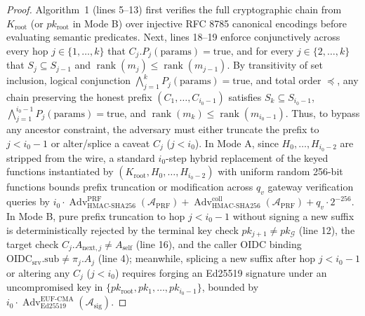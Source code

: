 \documentclass[conference,10pt]{IEEEtran}
\begin{document}
\begin{proof}
Algorithm~1 (lines 5--13) first verifies the full cryptographic chain from $K_{\text{root}}$ (or $pk_{\text{root}}$ in Mode B) over injective RFC 8785 canonical encodings before evaluating semantic predicates. Next, lines 18--19 enforce conjunctively across every hop $j \in \{1, \dots, k\}$ that $C_j.P_j(\text{params}) = \text{true}$, and for every $j \in \{2, \dots, k\}$ that $S_j \subseteq S_{j-1}$ and $\operatorname{rank}(m_j) \le \operatorname{rank}(m_{j-1})$. By transitivity of set inclusion, logical conjunction $\bigwedge_{j=1}^k P_j(\text{params}) = \text{true}$, and total order $\preceq$, any chain preserving the honest prefix $(C_1, \dots, C_{i_0-1})$ satisfies $S_k \subseteq S_{i_0-1}$, $\bigwedge_{j=1}^{i_0-1} P_j(\text{params}) = \text{true}$, and $\operatorname{rank}(m_k) \le \operatorname{rank}(m_{i_0-1})$. Thus, to bypass any ancestor constraint, the adversary must either truncate the prefix to $j < i_0 - 1$ or alter/splice a caveat $C_j$ ($j < i_0$). In Mode A, since $H_0, \dots, H_{i_0-2}$ are stripped from the wire, a standard $i_0$-step hybrid replacement of the keyed functions instantiated by $(K_{\text{root}}, H_0, \dots, H_{i_0-2})$ with uniform random 256-bit functions bounds prefix truncation or modification across $q_v$ gateway verification queries by $i_0 \cdot \operatorname{Adv}^{\text{PRF}}_{\operatorname{HMAC-SHA256}}(\mathcal{A}_{\text{PRF}}) + \operatorname{Adv}^{\text{coll}}_{\operatorname{HMAC-SHA256}}(\mathcal{A}_{\text{PRF}}) + q_v \cdot 2^{-256}$. In Mode B, pure prefix truncation to hop $j < i_0 - 1$ without signing a new suffix is deterministically rejected by the terminal key check $pk_{j+1} \neq pk_{\mathcal{G}}$ (line 12), the target check $C_j.A_{\text{next},j} \neq A_{\text{self}}$ (line 16), and the caller OIDC binding $\text{OIDC}_{\text{srv}}.\text{sub} \neq \pi_j.A_j$ (line 4); meanwhile, splicing a new suffix after hop $j < i_0 - 1$ or altering any $C_j$ ($j < i_0$) requires forging an Ed25519 signature under an uncompromised key in $\{pk_{\text{root}}, pk_1, \dots, pk_{i_0-1}\}$, bounded by $i_0 \cdot \operatorname{Adv}^{\text{EUF-CMA}}_{\operatorname{Ed25519}}(\mathcal{A}_{\text{sig}})$.
\end{proof}
\end{document}
